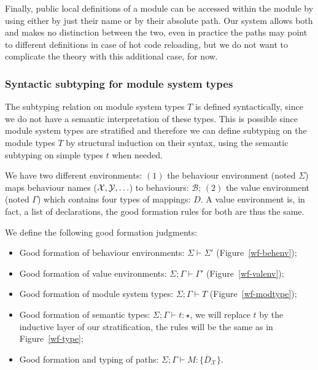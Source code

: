 \documentclass[a4paper,10pt]{article}
\begin{document}
Finally, public local definitions of a module can be accessed within the module by using either by just their name or by their absolute path. Our system allows both and makes no distinction between the two, even in practice the paths may point to different definitions in case of hot code reloading, but we do not want to complicate the theory with this additional case, for now.
  




\subsubsection{Syntactic subtyping for module system types}
The subtyping relation on module system types $T$ is defined syntactically,
since we do not have a semantic interpretation of these types. This is possible
since module system types are stratified and therefore we can define subtyping
on the module types $T$ by structural induction on their syntax, using the
semantic subtyping on simple types $t$ when needed.

We have two different environments: $(1)$ the behaviour environment
  (noted $\Sigma$) maps behaviour names ($\mathcal{X},\mathcal{Y},\ldots$) to behaviours:
  $\mathcal{B}$; $(2)$ the value environment (noted $\Gamma$) which contains
  four types of mappings: $D$.
  A value environment is, in fact, a list of declarations, the good formation
  rules for both are thus the same.

  We define the following good formation judgments:
  \begin{itemize}
    \item Good formation of behaviour environments: $\Sigma\vdash\Sigma'$ (Figure~\ref{wf-behenv});
    \item Good formation of value environments: $\Sigma;\Gamma\vdash\Gamma'$ (Figure~\ref{wf-valenv});
    \item Good formation of module system types: $\Sigma;\Gamma\vdash T$ (Figure~\ref{wf-modtype});
   \item Good formation of semantic types: $\Sigma;\Gamma\vdash t:\star$, we will
      replace $t$ by the inductive layer of our stratification, the rules will
      be the same as in Figure~\ref{wf-type}; 
     \item Good formation and typing of paths: $\Sigma;\Gamma\vdash M:\{\overline{D}_{\mathcal{X}}\}$.
  \end{itemize}
\end{document}
